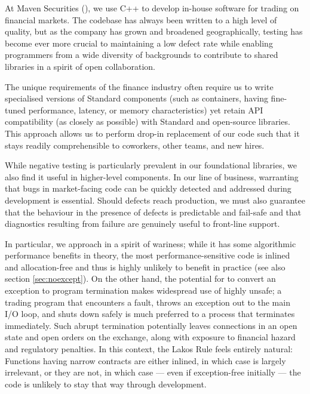 At Maven Securities (\hyperref[https://www.mavensecurities.com/]{}), we use C++ to develop in-house software for trading on financial markets. The codebase has always been written to a high level of quality, but as the company has grown and broadened geographically, testing has become ever more crucial to maintaining a low defect rate while enabling programmers from a wide diversity of backgrounds to contribute to shared libraries in a spirit of open collaboration.

The unique requirements of the finance industry often require us to write specialised versions of Standard components (such as containers, having fine-tuned performance, latency, or memory characteristics) yet retain API compatibility (as closely as possible) with Standard and open-source libraries. This approach allows us to perform drop-in replacement of our code such that it stays readily comprehensible to coworkers, other teams, and new hires.

While negative testing is particularly prevalent in our foundational libraries, we also find it useful in higher-level components. In our line of business, warranting that bugs in market-facing code can be quickly detected and addressed during development is essential. Should defects reach production, we must also guarantee that the behaviour in the presence of defects is predictable and fail-safe and that diagnostics resulting from failure are genuinely useful to front-line support.

In particular, we approach  in a spirit of wariness; while it has some algorithmic performance benefits in theory, the most performance-sensitive code is inlined and allocation-free and thus is highly unlikely to benefit in practice (see also section \ref{sec:noexcept}). On the other hand, the potential for  to convert an exception to program termination makes widespread use of  highly unsafe; a trading program that encounters a fault, throws an exception out to the main I/O loop, and shuts down safely is much preferred to a process that terminates immediately.  Such abrupt termination potentially leaves connections in an open state and open orders on the exchange, along with exposure to financial hazard and regulatory penalties. In this context, the Lakos Rule feels entirely natural: Functions having narrow contracts are either inlined, in which case 
is largely irrelevant, or they are not, in which case --- even if exception-free initially --- the code is unlikely to stay that way through development.

